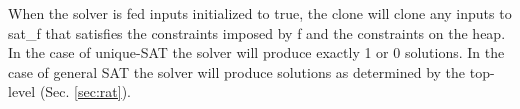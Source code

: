 \documentclass[preprint]{sigplanconf}
\newcommand{\xcomment}[2]{\textbf{#1:~\textsl{#2}}}
\newcommand{\amr}[1]{\xcomment{Amr}{#1}}
\begin{document}
When the solver is fed inputs initialized to {{true}}, the {{clone}}
will clone any inputs to {{sat_f}} that satisfies the constraints
imposed by {{f}} and the constraints on the {{heap}}. In the case of
unique-SAT the solver will produce exactly 1 or 0 solutions. In the
case of general SAT the solver will produce solutions as determined by
the top-level (Sec. \ref{sec:rat}).












\end{document}
